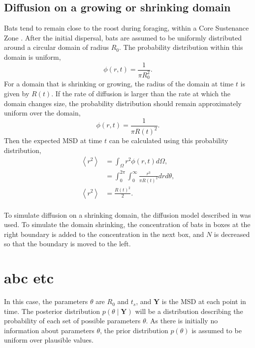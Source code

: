  \subsection{Diffusion on a growing or shrinking domain} \label{shrink}

Bats tend to remain close to the roost during foraging, within a Core Sustenance Zone \cite{Mathews2009}. After the initial dispersal, bats are assumed to be uniformly distributed
 around a circular domain of radius $R_0$. The probability distribution within this domain is
 uniform,
 \begin{equation}
 \phi(r,t) = \frac{1}{\pi R_0^2}.
 \end{equation}
 For a domain that is shrinking or growing, the radius of the domain at time $t$
 is given by $R(t)$. If the rate of diffusion is larger than the rate at which
 the domain changes size, the probability distribution should remain
 approximately uniform over the domain,
%
\begin{equation}
\phi(r,t) = \frac{1}{\pi R(t)^2}.
\end{equation}
%
 Then the expected MSD at time $t$ can be calculated using this probability distribution,
 \begin{equation}
 \begin{split}
 \left<r^2\right> 	&= \int_{\Omega}r^2 \phi(r,t) d\Omega ,\\
                 	&= \int_0^{2\pi}\int_0^{\infty} \frac{r^3}{\pi R(t)^2} dr d\theta, \\
 \left<r^2\right>	&= \frac{R(t)^2}{2} .\\
 \label{eqn:shrink_domain}
 \end{split}
 \end{equation}

 To simulate diffusion on a shrinking domain, the diffusion model described in
  was used. To simulate the domain shrinking, the
 concentration of bats in boxes at the right boundary is added to the
 concentration in the next box, and $N$ is decreased so that the boundary is moved
 to the left.

 \section{abc etc}


 In this case, the parameters $\theta$ are $R_0$ and $t_s$, and $\bm{Y}$ is the
 MSD at each point in time. The posterior
 distribution $ p(\theta \mid \bm{Y})$ will be a distribution describing the
 probability of each set of possible parameters $\theta$. As there is initially no information about parameters $\theta$, the prior distribution $p(\theta)$
 is assumed to be uniform over plausible values.

